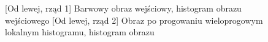 \documentclass[a4paper,12pt, titlepage]{report}
\begin{document}
\FloatBarrier
\begin{figure}[h]
    \centering
    \qquad
    \caption{[Od lewej, rząd 1] Barwowy obraz wejściowy, histogram obrazu wejściowego [Od lewej, rząd 2] Obraz po progowaniu wieloprogowym lokalnym histogramu, histogram obrazu}%
    \label{fig:geo_after_grey1}%
\end{figure}
\FloatBarrier
\end{document}
